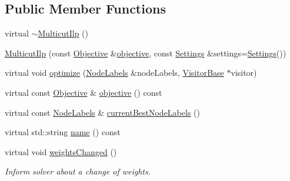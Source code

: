 \subsection*{Public Member Functions}
\begin{DoxyCompactItemize}
\item 
virtual \hyperlink{classnifty_1_1graph_1_1optimization_1_1multicut_1_1MulticutIlp_a1da47db8d4c0b87a966d958c21eebc9c}{$\sim$\+Multicut\+Ilp} ()
\item 
\hyperlink{classnifty_1_1graph_1_1optimization_1_1multicut_1_1MulticutIlp_af761bf51a8dcd40bc485e3e0d60d20ee}{Multicut\+Ilp} (const \hyperlink{classnifty_1_1graph_1_1optimization_1_1multicut_1_1MulticutIlp_a1c9fe5899608fc9c8e32bde6648c8278}{Objective} \&\hyperlink{classnifty_1_1graph_1_1optimization_1_1multicut_1_1MulticutIlp_a4d75fe18138dae4c11a3a0bd6095d23b}{objective}, const \hyperlink{structnifty_1_1graph_1_1optimization_1_1multicut_1_1MulticutIlp_1_1Settings}{Settings} \&settings=\hyperlink{structnifty_1_1graph_1_1optimization_1_1multicut_1_1MulticutIlp_1_1Settings}{Settings}())
\item 
virtual void \hyperlink{classnifty_1_1graph_1_1optimization_1_1multicut_1_1MulticutIlp_a4160786a822fc7fde6bdf30da556a2d8}{optimize} (\hyperlink{classnifty_1_1graph_1_1optimization_1_1multicut_1_1MulticutIlp_a0b5224bc8998dda829c920e8d3338fee}{Node\+Labels} \&node\+Labels, \hyperlink{classnifty_1_1graph_1_1MulticutBase_a5882fb69df59d8113f6a81a0dac26eaa}{Visitor\+Base} $\ast$visitor)
\item 
virtual const \hyperlink{classnifty_1_1graph_1_1optimization_1_1multicut_1_1MulticutIlp_a1c9fe5899608fc9c8e32bde6648c8278}{Objective} \& \hyperlink{classnifty_1_1graph_1_1optimization_1_1multicut_1_1MulticutIlp_a4d75fe18138dae4c11a3a0bd6095d23b}{objective} () const 
\item 
virtual const \hyperlink{classnifty_1_1graph_1_1optimization_1_1multicut_1_1MulticutIlp_a0b5224bc8998dda829c920e8d3338fee}{Node\+Labels} \& \hyperlink{classnifty_1_1graph_1_1optimization_1_1multicut_1_1MulticutIlp_a7f6e490a80a0b130d77517e8075dbef0}{current\+Best\+Node\+Labels} ()
\item 
virtual std\+::string \hyperlink{classnifty_1_1graph_1_1optimization_1_1multicut_1_1MulticutIlp_a5093a9286730b9deed24a200cc8c035b}{name} () const 
\item 
virtual void \hyperlink{classnifty_1_1graph_1_1optimization_1_1multicut_1_1MulticutIlp_a741353b34b8997acb8eb502608a8b1ec}{weights\+Changed} ()
\begin{DoxyCompactList}\small\item\em Inform solver about a change of weights. \end{DoxyCompactList}\end{DoxyCompactItemize}


